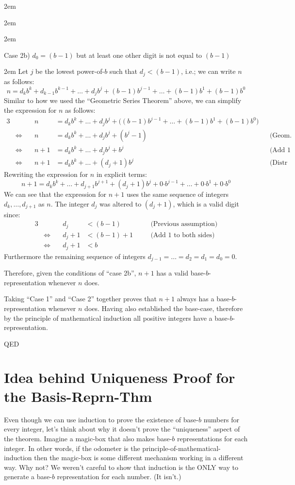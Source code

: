 \documentclass{article}
\newenvironment{jprIn}{\begin{adjustwidth}{2em}{}}{\end{adjustwidth}}
\begin{document}
\begin{jprIn}
\begin{jprIn}
\begin{jprIn}
\end{jprIn}
Case 2b) $d_0=(b-1)$ but at least one other digit is not equal to $(b-1)$
\begin{jprIn}
Let $j$ be the lowest power-of-$b$ such that $d_j<(b{-}1)$,
i.e.; we can write $n$ as follows:
\[n = d_kb^k+d_{k-1}b^{k-1}+\dots+d_jb^j+(b{-}1)b^{j-1}+\dots+(b{-}1)b^1+(b{-}1)b^0\]
Similar to how we used the ``Geometric Series Theorem'' above,
we can simplify the expression for $n$ as follows:
{\small
\begin{alignat*}{3}
  &&n
  &= d_kb^k+\dots+d_jb^j+\big((b{-}1)b^{j-1}+\dots+(b{-}1)b^1+(b{-}1)b^0\big)&&\\
  &\Leftrightarrow\quad
  &n
  &= d_kb^k+\dots+d_jb^j+(b^j-1) &&\text{(Geom. Series Thm.)}\\
  &\Leftrightarrow\quad
  &n+1
  &=  d_kb^k+\dots+d_jb^j+b^j &&\text{(Add 1 to both sides)}\\
  &\Leftrightarrow\quad
  &n+1
  &=  d_kb^k+\dots+(d_j+1)b^j &&\text{(Distr Axiom)}
\end{alignat*}
}Rewriting the expression for $n$ in explicit terms:
\[n+1= d_kb^k+\dots+d_{j+1}b^{j+1}+(d_j+1)b^j+0{\cdot{}}{}b^{j-1}+\dots{}+0{\cdot{}}b^1+0{\cdot{}}b^0\]
We can see that the expression for $n+1$ uses the same
sequence of integers $d_k,\dots{},d_{j+1}$ as $n$.
The integer $d_j$ was altered to $(d_j{+}1)$, which is a valid digit since:
\begin{alignat*}{3}
  &&d_j
  &< (b-1) &&\quad\text{(Previous assumption)}\\
  &\Leftrightarrow\quad
  &d_j+1
  &< (b-1)+1 &&\quad\text{(Add 1 to both sides)}\\  
  &\Leftrightarrow\quad
  &d_j+1
  &< b
\end{alignat*}
Furthermore the remaining sequence of integers $d_{j-1}=\dots{}=d_2=d_1=d_0=0$.

Therefore, given the conditions of ``case 2b'', $n+1$ has
a valid base-$b$-representation whenever $n$ does.
\end{jprIn}
\end{jprIn}
Taking ``Case 1'' and ``Case 2'' together proves that $n+1$
always has a base-$b$-representation whenever $n$ does.
Having also established the base-case, therefore by the principle of mathematical induction
all positive integers have a base-$b$-representation.

QED
\end{jprIn}

\section*{Idea behind Uniqueness Proof for the Basis-Reprn-Thm}
Even though we can use induction to prove the existence of base-$b$
numbers for every integer, let's think about why it
doesn't prove the ``uniqueness'' aspect of 
the theorem.
Imagine a magic-box
that also makes base-$b$ representations for each
integer.
In other words, if the odometer is the principle-of-mathematical-induction then the magic-box
is some different mechanism working in a different way.
Why not? We weren't careful to show that induction is the ONLY way
to generate a base-$b$ representation for each number. (It isn't.)
\end{document}
